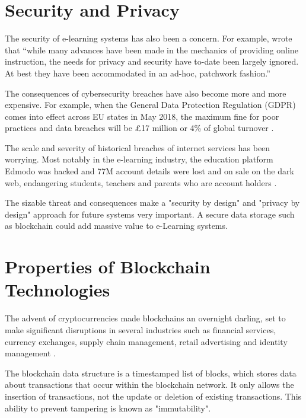 
\section{Security and Privacy}

The security of e-learning systems has also been a concern. For example, \citet{el2003privacy} wrote that “while many
advances have been made in the mechanics of providing online instruction, the needs for privacy and security have to-date
been largely ignored. At best they have been accommodated in an ad-hoc, patchwork fashion.”

The consequences of cybersecurity breaches have also become more and more expensive. For example, when the General Data
Protection Regulation (GDPR) comes into effect across EU states in May 2018, the maximum fine for poor practices and data
breaches will be £17 million or 4\% of global turnover \citep{ico2017gdpr}.

The scale and severity of historical breaches of internet services has been worrying. Most notably in the e-learning
industry, the education platform Edmodo was hacked and 77M account details were lost and on sale on the dark
web, endangering students, teachers and parents who are account holders \citep{opsecmonkey2017edmodo}.

The sizable threat and consequences make a "security by design" and "privacy by design" approach for future 
systems very important. A secure data storage such as blockchain could add massive value to e-Learning systems.

\section{Properties of Blockchain Technologies}

The advent of cryptocurrencies made blockchains an overnight darling, set to make significant disruptions
in several industries such as financial services, currency exchanges, supply chain management, retail
advertising and identity management \citep{forbes2017industries}.

The blockchain data structure is a timestamped list of blocks, which stores data about transactions
that occur within the blockchain network. It only allows the insertion of transactions, not the update
or deletion of existing transactions. This ability to prevent tampering is known as "immutability". \citep[p.182]{xu2016blockchain}

